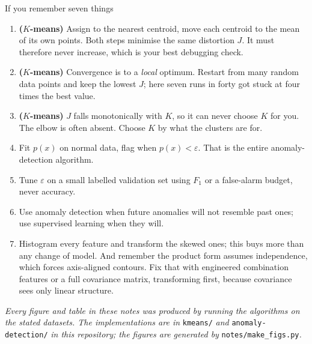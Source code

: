 \documentclass[11pt,a4paper]{article}
\begin{document}
\begin{keybox}{If you remember seven things}
\begin{enumerate}[label=\arabic*.,leftmargin=*]
\item \textbf{($K$-means)} Assign to the nearest centroid, move each centroid
      to the mean of its own points. Both steps minimise the same distortion
      $J$. It must therefore never increase, which is your best debugging
      check.
\item \textbf{($K$-means)} Convergence is to a \emph{local} optimum. Restart
      from many random data points and keep the lowest $J$; here seven runs in
      forty got stuck at four times the best value.
\item \textbf{($K$-means)} $J$ falls monotonically with $K$, so it can never
      choose $K$ for you. The elbow is often absent. Choose $K$ by what the
      clusters are for.
\item Fit $p(x)$ on normal data, flag when $p(x) < \varepsilon$. That is the
      entire anomaly-detection algorithm.
\item Tune $\varepsilon$ on a small labelled validation set using $F_1$ or a
      false-alarm budget, never accuracy.
\item Use anomaly detection when future anomalies will not resemble past ones;
      use supervised learning when they will.
\item Histogram every feature and transform the skewed ones; this buys more
      than any change of model. And remember the product form assumes
      independence, which forces axis-aligned contours. Fix that with
      engineered combination features or a full covariance matrix, transforming
      first, because covariance sees only linear structure.
\end{enumerate}
\end{keybox}

\bigskip
\noindent\small\textit{Every figure and table in these notes was produced by
running the algorithms on the stated datasets. The implementations are in}
\texttt{kmeans/} \textit{and} \texttt{anomaly-detection/} \textit{in this
repository; the figures are generated by} \texttt{notes/make\_figs.py}\textit{.}
\end{document}

